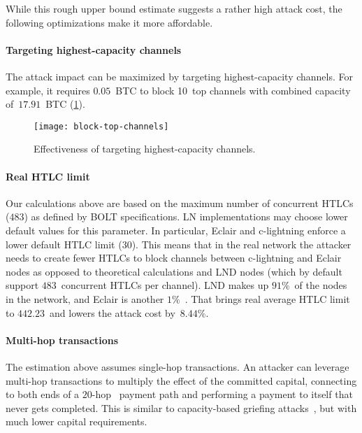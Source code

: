 While this rough upper bound estimate suggests a rather high attack cost, the following optimizations make it more affordable.


\paragraph{Targeting highest-capacity channels}
The attack impact can be maximized by targeting highest-capacity channels.
For example, it requires $0.05$~BTC to block 10~top channels with combined capacity of~$17.91$~BTC (\cref{fig:block-top-channels}).

\begin{figure}[tb]
	\centering
	\texttt{[image: block-top-channels]}
	\caption{Effectiveness of targeting highest-capacity channels.}
	\label{fig:block-top-channels}
\end{figure}

\paragraph{Real HTLC limit}
Our calculations above are based on the maximum number of concurrent HTLCs ($483$) as defined by BOLT specifications.
LN implementations may choose lower default values for this parameter.
In particular, Eclair and c-lightning enforce a lower default HTLC limit ($30$).
This means that in the real network the attacker needs to create fewer HTLCs to block channels between c-lightning and Eclair nodes as opposed to theoretical calculations and LND nodes (which by default support $483$~concurrent HTLCs per channel).
LND makes up $91\%$~of the nodes in the network, and Eclair is another $1\%$~\cite{Mizrahi2020}.
That brings real average HTLC limit to $442.23$~and lowers the attack cost by~$8.44\%$.

\paragraph{Multi-hop transactions}
The estimation above assumes single-hop transactions.
An attacker can leverage multi-hop transactions to multiply the effect of the committed capital, connecting to both ends of a $20$-hop~\cite{Bolt4OnionRouting} payment path and performing a payment to itself that never gets completed.
This is similar to capacity-based griefing attacks~\cite{HerreraJoancomarti2019}, but with much lower capital requirements.

